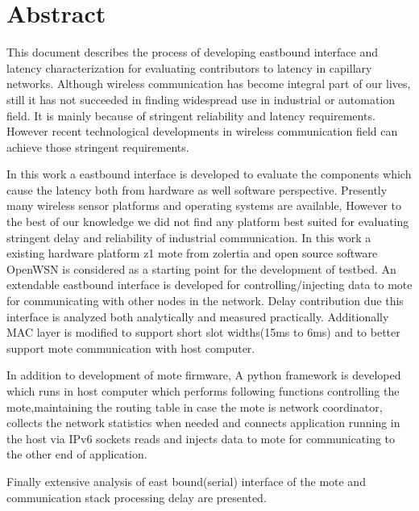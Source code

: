 \thispagestyle{plain}

\section*{Abstract}
This document describes the process of developing eastbound interface and latency characterization for evaluating contributors to latency in capillary networks. Although wireless communication has become integral part of our lives, still it has not succeeded in finding widespread use in industrial or automation field. It is mainly because of stringent reliability and latency requirements. However recent technological developments in wireless communication field can achieve those stringent requirements.

In this work a eastbound interface is developed to evaluate the components which cause the latency both from hardware as well software perspective. Presently many wireless sensor platforms and operating systems are available, However to the best of our knowledge we did not find any platform best suited for evaluating stringent delay and reliability of industrial communication. In this work a existing hardware platform z1 mote from zolertia and open source software OpenWSN is considered as a starting point for the development of testbed. An extendable eastbound interface is developed for controlling/injecting data to mote for communicating with other nodes in the network. Delay contribution due this interface is analyzed both analytically and measured practically. Additionally MAC layer is modified to support short slot widths(15ms to 6ms) and to better support mote communication with host computer.

In addition to development of mote firmware, A python framework is developed which runs in host computer which performs following functions controlling the mote,maintaining the routing table in case the mote is network coordinator, collects the network statistics when needed and connects application running in the host via IPv6 sockets reads and injects data to mote for communicating to the other end of application.

Finally extensive analysis of east bound(serial) interface of the mote and communication stack processing delay are presented.